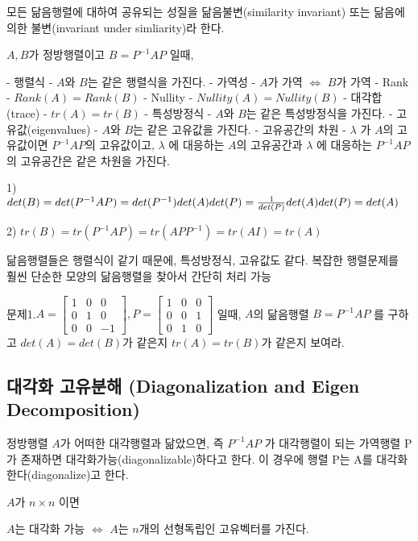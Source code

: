 \begin{theorem}

모든 닮음행렬에 대하여 공유되는 성질을 닮음불변(similarity invariant) 또는 닮음에 의한 불변(invariant under simliarity)라 한다.

$A, B$가 정방행렬이고 $B=P^{-1}AP$ 일때,

- 행렬식 - $A$와 $B$는 같은 행렬식을 가진다.
- 가역성 - $A$가 가역 $\iff$ $B$가 가역
- Rank - $Rank(A) = Rank(B)$
- Nullity - $Nullity(A) = Nullity(B)$
- 대각합(trace) - $tr(A) = tr(B)$
- 특성방정식 - $A$와 $B$는 같은 특성방정식을 가진다.
- 고유값(eigenvalues) - $A$와 $B$는 같은 고유값을 가진다.
- 고유공간의 차원 - $\lambda$ 가 $A$의 고유값이면 $P^{-1}AP$의 고유값이고, $\lambda$ 에 대응하는 $A$의 고유공간과 $\lambda$ 에 대응하는 $P^{-1}AP$의 고유공간은 같은 차원을 가진다.

1) $det(B)=det(P^{-1}AP)=det(P^{-1})det(A)det(P)= {1 \over det(P)}det(A)det(P)=det(A)$

2) $tr(B) = tr(P^{-1}AP) = tr(APP^{-1}) = tr(AI) = tr(A)$

\end{theorem}

\begin{lemma} 
닮음행렬들은 행렬식이 같기 때문에, 특성방정식, 고유값도 같다. 복잡한 행렬문제를 훨씬 단순한 모양의 닮음행렬을 찾아서 간단히 처리 가능
\end{lemma}
\newpage
문제1.$A=\begin{bmatrix}1 &0&0\\0&1&0\\0&0&-1\end{bmatrix}, P=\begin{bmatrix}1&0&0\\0&0&1\\0&1&0\end{bmatrix}$ 일때, $A$의 닮음행렬 $B=P^{-1}AP$ 를 구하고 $det(A)=det(B)$가 같은지 $tr(A)=tr(B)$가 같은지 보여라.
\newpage
\subsection{대각화 고유분해 (Diagonalization and Eigen Decomposition)}

\begin{definition} 
정방행렬 $A$가 어떠한 대각행렬과 닮았으면, 즉 $P^{-1}AP$ 가 대각행렬이 되는 가역행렬 P가 존재하면 대각화가능(diagonalizable)하다고 한다. 이 경우에 행렬 P는 A를 대각화한다(diagonalize)고 한다.
\end{definition}
\begin{theorem}
  
$A$가 $n \times n$ 이면

$A$는 대각화 가능 $\iff$ $A$는 $n$개의 선형독립인 고유벡터를 가진다.

\end{theorem}

